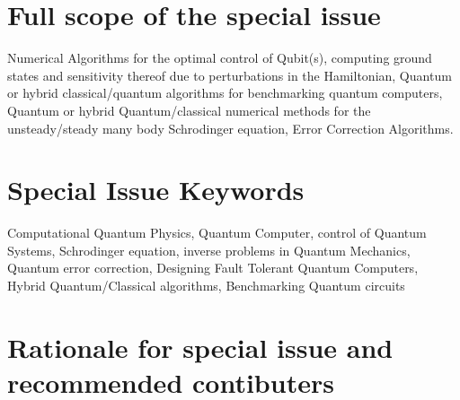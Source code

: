 \documentclass[]{article}
\begin{document}
 
\section{Full scope of the special issue }

Numerical Algorithms for the optimal control of Qubit(s), computing ground states and sensitivity thereof due to perturbations in the Hamiltonian, Quantum or hybrid classical/quantum algorithms for benchmarking quantum computers, Quantum or hybrid Quantum/classical numerical methods for the unsteady/steady many body Schrodinger equation, Error Correction Algorithms.

\section{Special Issue Keywords }

Computational Quantum Physics, Quantum Computer, control of Quantum Systems, Schrodinger equation, inverse problems in Quantum Mechanics, Quantum error correction, Designing Fault Tolerant Quantum Computers, Hybrid Quantum/Classical algorithms, Benchmarking Quantum circuits

\section{Rationale for special issue and recommended contibuters}

\begin{comment}

\cite{BLATT1967382}
``Practical points concerning the solution of the Schrödinger equation''
\cite{FEIT1982412}
``Solution of the Schrödinger equation by a spectral method''
\cite{https://doi.org/10.1002/andp.19273892002}
``Zur Quantentheorie der Molekeln''
\cite{wang2020localization}
``Localization and delocalization of light in photonic moir{\'e} lattices''
``Approximating spectral densities of large matrices''
\cite{ramkarthik2021numerical}
``Numerical recipes in quantum information theory and quantum computing: an adventure in FORTRAN 90''
\cite{yeomans1988theory}
``The theory and application of axial Ising models''
\cite{milburn2000ion}
``Ion trap quantum computing with warm ions''

\cite{shastri2021photonics}
``Photonics for artificial intelligence and neuromorphic computing''

\cite{wanjura2024fully}
``Fully nonlinear neuromorphic computing with linear wave scattering''
\cite{de2024spin}
``A spin-optical quantum computing architecture''
\cite{heurtel2023perceval}
``Perceval: A software platform for discrete variable photonic quantum computing''
\cite{wiebe2014quantum}
``Quantum deep learning''

\end{comment}
\end{document}
